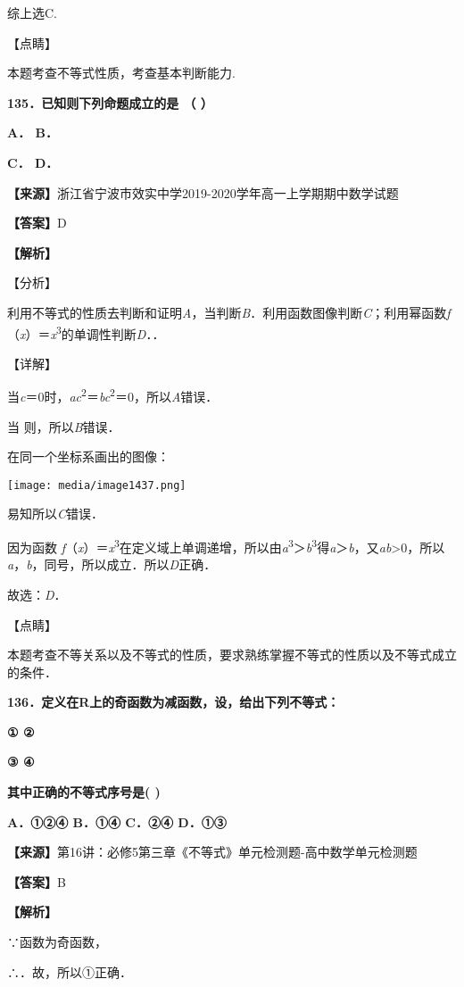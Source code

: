 综上选C.

【点睛】

本题考查不等式性质，考查基本判断能力.

\textbf{135．已知则下列命题成立的是 （ ）}

\textbf{A． B．}

\textbf{C． D．}

\textbf{【来源】}浙江省宁波市效实中学2019-2020学年高一上学期期中数学试题

\textbf{【答案】}D

\textbf{【解析】}

【分析】

利用不等式的性质去判断和证明\emph{A}，当判断\emph{B}．利用函数图像判断\emph{C}；利用幂函数\emph{f}（\emph{x}）＝\emph{x}\textsuperscript{3}的单调性判断\emph{D}．．

【详解】

当\emph{c}＝0时，\emph{ac}\textsuperscript{2}＝\emph{bc}\textsuperscript{2}＝0，所以\emph{A}错误．

当 则，所以\emph{B}错误．

在同一个坐标系画出的图像：

\texttt{[image: media/image1437.png]}

易知所以\emph{C}错误．

因为函数
\emph{f}（\emph{x}）＝\emph{x}\textsuperscript{3}在定义域上单调递增，所以由\emph{a}\textsuperscript{3}＞\emph{b}\textsuperscript{3}得\emph{a}＞\emph{b}，又\emph{ab}\textgreater0，所以\emph{a}，\emph{b}，同号，所以成立．所以\emph{D}正确．

故选：\emph{D}．

【点睛】

本题考查不等关系以及不等式的性质，要求熟练掌握不等式的性质以及不等式成立的条件．

\textbf{136．定义在R上的奇函数为减函数，设，给出下列不等式：}

\textbf{① ②}

\textbf{③ ④}

\textbf{其中正确的不等式序号是( )}

\textbf{A．①②④ B．①④ C．②④ D．①③}

\textbf{【来源】}第16讲：必修5第三章《不等式》单元检测题-高中数学单元检测题

\textbf{【答案】}B

\textbf{【解析】}

∵函数为奇函数，

∴．故，所以①正确．

